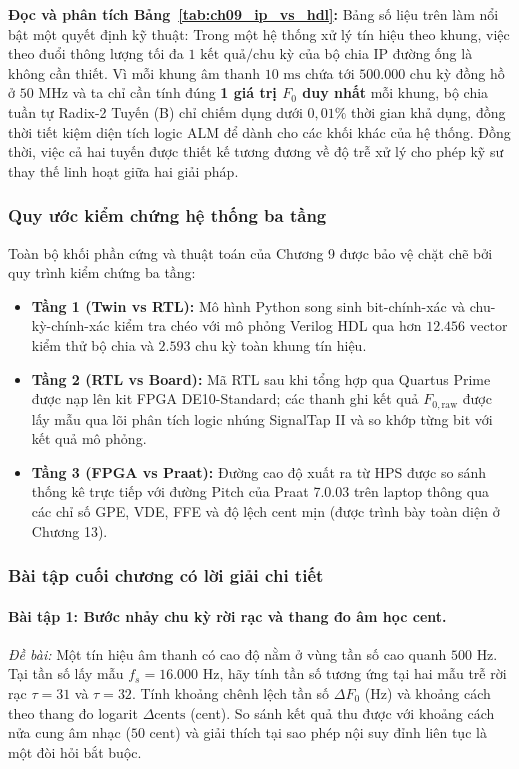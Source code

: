 \textbf{Đọc và phân tích Bảng~\ref{tab:ch09_ip_vs_hdl}:}
Bảng số liệu trên làm nổi bật một quyết định kỹ thuật: Trong một hệ thống xử lý tín hiệu theo khung, việc theo đuổi thông lượng tối đa $1\text{ kết quả/chu kỳ}$ của bộ chia IP đường ống là không cần thiết. Vì mỗi khung âm thanh $10\text{ ms}$ chứa tới $500.000\text{ chu kỳ}$ đồng hồ ở $50\text{ MHz}$ và ta chỉ cần tính đúng \textbf{1 giá trị $F_0$ duy nhất} mỗi khung, bộ chia tuần tự Radix-2 Tuyến (B) chỉ chiếm dụng dưới $0{,}01\%$ thời gian khả dụng, đồng thời tiết kiệm diện tích logic ALM để dành cho các khối khác của hệ thống. Đồng thời, việc cả hai tuyến được thiết kế tương đương về độ trễ xử lý cho phép kỹ sư thay thế linh hoạt giữa hai giải pháp.

\subsubsection*{Quy ước kiểm chứng hệ thống ba tầng}
Toàn bộ khối phần cứng và thuật toán của Chương 9 được bảo vệ chặt chẽ bởi quy trình kiểm chứng ba tầng:
\begin{itemize}[leftmargin=1.5em, itemsep=2pt]
    \item \textbf{Tầng 1 (Twin vs RTL):} Mô hình Python song sinh bit-chính-xác và chu-kỳ-chính-xác kiểm tra chéo với mô phỏng Verilog HDL qua hơn $12.456\text{ vector}$ kiểm thử bộ chia và $2.593\text{ chu kỳ}$ toàn khung tín hiệu.
    \item \textbf{Tầng 2 (RTL vs Board):} Mã RTL sau khi tổng hợp qua Quartus Prime được nạp lên kit FPGA DE10-Standard; các thanh ghi kết quả $F_{0, \text{raw}}$ được lấy mẫu qua lõi phân tích logic nhúng SignalTap II và so khớp từng bit với kết quả mô phỏng.
    \item \textbf{Tầng 3 (FPGA vs Praat):} Đường cao độ xuất ra từ HPS được so sánh thống kê trực tiếp với đường Pitch của Praat 7.0.03 trên laptop thông qua các chỉ số GPE, VDE, FFE và độ lệch cent mịn (được trình bày toàn diện ở Chương 13).
\end{itemize}

\subsubsection*{Bài tập cuối chương có lời giải chi tiết}

\paragraph{Bài tập 1: Bước nhảy chu kỳ rời rạc và thang đo âm học cent.}
\emph{Đề bài:} Một tín hiệu âm thanh có cao độ nằm ở vùng tần số cao quanh $500\text{ Hz}$. Tại tần số lấy mẫu $f_s = 16.000\text{ Hz}$, hãy tính tần số tương ứng tại hai mẫu trễ rời rạc $\tau = 31$ và $\tau = 32$. Tính khoảng chênh lệch tần số $\Delta F_0$ (Hz) và khoảng cách theo thang đo logarit $\Delta \text{cents}$ (cent). So sánh kết quả thu được với khoảng cách nửa cung âm nhạc ($50\text{ cent}$) và giải thích tại sao phép nội suy đỉnh liên tục là một đòi hỏi bắt buộc.

